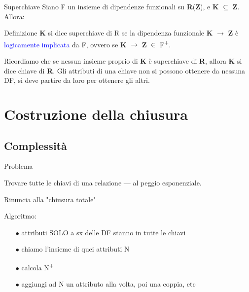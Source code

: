 \documentclass{beamer}
\begin{document}
\begin{frame}{Superchiave}
    Siano F un insieme di dipendenze funzionali su \textbf{R}(\textbf{Z}), e \textbf{K} $\subseteq$ \textbf{Z}. Allora:
    \begin{block}{Definizione}
         \textbf{K} si dice superchiave di R se la dipendenza funzionale \textbf{K} $\rightarrow$ \textbf{Z} è \textcolor{blue}{logicamente implicata} da F, ovvero se \textbf{K} $\rightarrow$ \textbf{Z} $\in$ F\textsuperscript{+}.
    \end{block}
    
    \vfill
    Ricordiamo che se nessun insieme proprio di \textbf{K} è superchiave di \textbf{R}, allora \textbf{K} si dice chiave di \textbf{R}. Gli attributi di una chiave non si possono ottenere da nessuna DF, si deve partire da loro per ottenere gli altri.

\end{frame}



\section{Costruzione della chiusura}
\subsection{Complessità}
\begin{frame}{Problema}
    \begin{block}{}
        Trovare tutte le chiavi di una relazione --- al peggio esponenziale. \par
        Rinuncia alla "chiusura totale"
    \end{block}
    \vfill
    Algoritmo:
    \begin{itemize}
        \item[$\bullet$] attributi SOLO a sx delle DF stanno in tutte le chiavi
        \item[$\bullet$] chiamo l'insieme di quei attributi N
        \item[$\bullet$] calcola N\textsuperscript{+}
        \item[$\bullet$] aggiungi ad N un attributo alla volta, poi una coppia, etc
    \end{itemize}
\end{frame}
\end{document}
